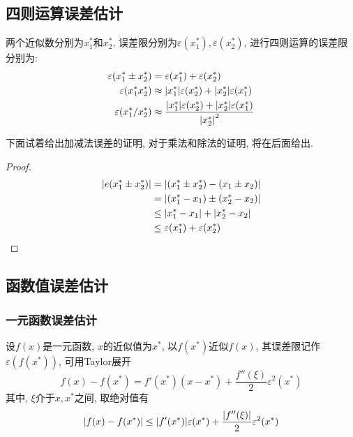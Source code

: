 \subsection{四则运算误差估计}

两个近似数分别为$x_1^*$和$x_2^*$, 误差限分别为$\varepsilon(x_1^*),\varepsilon(x_2^*)$, 进行四则运算的误差限分别为:
\begin{align*}
    \varepsilon(x_1^*\pm x_2^*)&=\varepsilon(x_1^*)+\varepsilon(x_2^*)\\
    \varepsilon(x_1^*x_2^*)&\approx\abs{x_1^*}\varepsilon(x_2^*)+\abs{x_2^*}\varepsilon(x_1^*)\\
    \varepsilon(x_1^*/x_2^*)&\approx\frac{\abs{x_1^*}\varepsilon(x_2^*)+\abs{x_2^*}\varepsilon(x_1^*)}{\abs{x_2^*}^2}
\end{align*}

下面试着给出加减法误差的证明, 对于乘法和除法的证明, 将在后面给出.

\begin{proof}
    \begin{align*}
        \abs{e(x_1^*\pm x_2^*)}&=\abs{(x_1^*\pm x_2^*)-(x_1\pm x_2)}\\
        &=\abs{(x_1^*-x_1)\pm(x_2^*-x_2)}\\
        &\le\abs{x_1^*-x_1}+\abs{x_2^*-x_2}\\
        &\le\varepsilon(x_1^*)+\varepsilon(x_2^*)
    \end{align*}
\end{proof}

\subsection{函数值误差估计}

\subsubsection{一元函数误差估计}

设$f(x)$是一元函数, $x$的近似值为$x^*$, 以$f(x^*)$近似$f(x)$, 其误差限记作$\varepsilon(f(x^*))$, 可用Taylor展开
\begin{equation*}
    f(x)-f(x^*)=f'(x^*)(x-x^*)+\frac{f''(\xi)}{2}\varepsilon^2(x^*)
\end{equation*}
其中, $\xi$介于$x, x^*$之间, 取绝对值有
\begin{equation*}
    \abs{f(x)-f(x^*)}\le\abs{f'(x^*)}\varepsilon(x^*)+\frac{\abs{f''(\xi)}}{2}\varepsilon^2(x^*)
\end{equation*}

